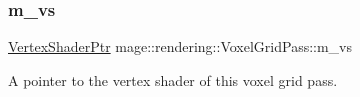 \subsubsection{\texorpdfstring{m\+\_\+vs}{m\_vs}}
{\footnotesize\ttfamily \mbox{\hyperlink{namespacemage_1_1rendering_aaf704b9c54a4181f4950a1761de69dda}{Vertex\+Shader\+Ptr}} mage\+::rendering\+::\+Voxel\+Grid\+Pass\+::m\+\_\+vs\hspace{0.3cm}{\ttfamily [private]}}

A pointer to the vertex shader of this voxel grid pass. 